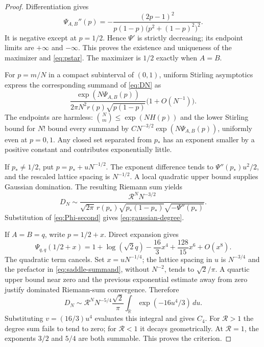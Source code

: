 \documentclass[11pt,a4paper]{article}
\numberwithin{equation}{section}
\theoremstyle{definition}
\theoremstyle{remark}
\newcommand{\R}{\mathbb R}
\begin{document}
\begin{proof}
Differentiation gives
\begin{equation}\label{eq:Phi-second}
 \Psi_{A,B}''(p)=
 -\frac{(2p-1)^2}{p(1-p)\bigl(p^2+(1-p)^2\bigr)^2}.
\end{equation}
It is negative except at $p=1/2$. Hence $\Psi'$ is strictly decreasing;
its endpoint limits are $+\infty$ and $-\infty$. This proves the
existence and uniqueness of the maximizer and \eqref{eq:pstar}.
The maximizer is $1/2$ exactly when $A=B$.

For $p=m/N$ in a compact subinterval of $(0,1)$, uniform Stirling
asymptotics express the corresponding summand of \eqref{eq:DN} as
\begin{equation}\label{eq:saddle-summand}
 \frac{\exp(N\Psi_{A,B}(p))}{2\pi N^2r(p)\sqrt{p(1-p)}}
 \bigl(1+O(N^{-1})\bigr).
\end{equation}
The endpoints are harmless: $\binom Nm\le\exp(NH(p))$ and the lower
Stirling bound for $N!$ bound every summand by
$C N^{-3/2}\exp(N\Psi_{A,B}(p))$, uniformly even at $p=0,1$.
Any closed set separated from $p_*$ has an exponent smaller by a
positive constant and contributes exponentially little.

If $p_*\ne1/2$, put $p=p_*+uN^{-1/2}$. The exponent difference tends to
$\Psi''(p_*)u^2/2$, and the rescaled lattice spacing is $N^{-1/2}$.
A local quadratic upper bound supplies Gaussian domination. The
resulting Riemann sum yields
\[
 D_N\sim\frac{\mathcal R^N N^{-3/2}}
 {\sqrt{2\pi}\,r(p_*)\sqrt{p_*(1-p_*)}\sqrt{-\Psi''(p_*)}}.
\]
Substitution of \eqref{eq:Phi-second} gives \eqref{eq:gaussian-degree}.

If $A=B=q$, write $p=1/2+x$. Direct expansion gives
\begin{equation}\label{eq:quartic-expansion}
 \Psi_{q,q}(1/2+x)=1+\log(\sqrt2 q)
 -\frac{16}{3}x^4+\frac{128}{15}x^6+O(x^8).
\end{equation}
The quadratic term cancels. Set $x=uN^{-1/4}$; the lattice spacing in
$u$ is $N^{-3/4}$ and the prefactor in \eqref{eq:saddle-summand}, without
$N^{-2}$, tends to $\sqrt2/\pi$. A quartic upper bound near zero and
the previous exponential estimate away from zero justify dominated
Riemann-sum convergence. Therefore
\[
 D_N\sim\mathcal R^N N^{-5/4}\frac{\sqrt2}{\pi}
 \int_{\R}\exp(-16u^4/3)\,du.
\]
Substituting $v=(16/3)u^4$ evaluates this integral and gives $C_4$.
For $\mathcal R>1$ the degree sum fails to tend to zero; for
$\mathcal R<1$ it decays geometrically. At $\mathcal R=1$, the
exponents $3/2$ and $5/4$ are both summable. This proves the criterion.
\end{proof}
\end{document}
